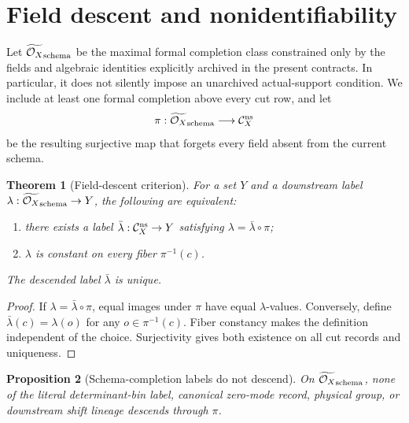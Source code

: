 \documentclass[11pt]{article}
\newtheorem{theorem}{Theorem}[section]
\newtheorem{proposition}[theorem]{Proposition}
\theoremstyle{definition}
\theoremstyle{remark}
\newcommand{\Ccut}{\mathcal C_X^{\rm ns}}
\newcommand{\Occ}{\mathcal O_X}
\begin{document}
\section{Field descent and nonidentifiability}

Let \(\widetilde{\Occ}_{\rm schema}\) be the maximal formal completion
class constrained only by the fields and algebraic identities
explicitly archived in the present contracts.  In particular, it does
not silently impose an unarchived actual-support condition.  We
include at least one formal completion above every cut row, and let
\[
 \pi:\widetilde{\Occ}_{\rm schema}\longrightarrow\Ccut
\]
be the resulting surjective map that forgets every field absent from
the current schema.

\begin{theorem}[Field-descent criterion]
\label{thm:descent}
For a set \(Y\) and a downstream label
\(\lambda:\widetilde{\Occ}_{\rm schema}\to Y\), the following are
equivalent:
\begin{enumerate}[label=(\alph*),leftmargin=2em]
\item there exists a label \(\bar\lambda:\Ccut\to Y\) satisfying
\(\lambda=\bar\lambda\circ\pi\);
\item \(\lambda\) is constant on every fiber
\(\pi^{-1}(c)\).
\end{enumerate}
The descended label \(\bar\lambda\) is unique.
\end{theorem}

\begin{proof}
If \(\lambda=\bar\lambda\circ\pi\), equal images under \(\pi\) have
equal \(\lambda\)-values.  Conversely, define
\(\bar\lambda(c)=\lambda(o)\) for any \(o\in\pi^{-1}(c)\).
Fiber constancy makes the definition independent of the choice.
Surjectivity gives both existence on all cut records and uniqueness.
\end{proof}

\begin{proposition}[Schema-completion labels do not descend]
\label{prop:nondescend}
On \(\widetilde{\Occ}_{\rm schema}\), none of the literal
determinant-bin label, canonical zero-mode record, physical group, or
downstream shift lineage descends through \(\pi\).
\end{proposition}
\end{document}
